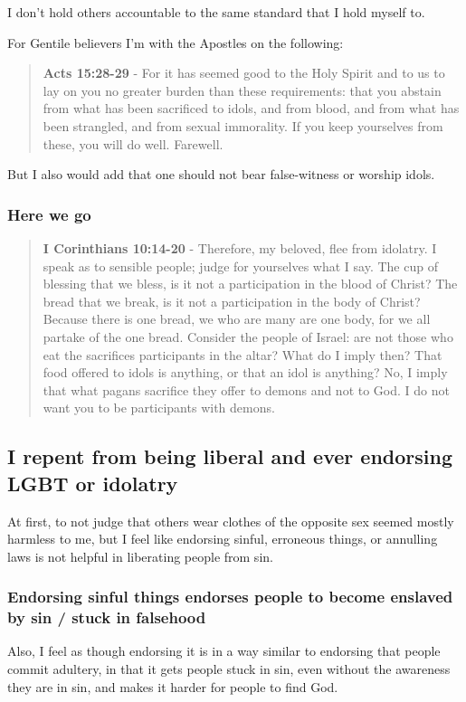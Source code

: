 \documentclass[11pt]{article}
\begin{document}
I don't hold others accountable to the same standard that I hold myself to.

For Gentile believers I'm with the Apostles on the following:

\begin{quote}
\textbf{Acts 15:28-29} - For it has seemed good to the Holy Spirit and to us to lay on you no greater burden than these requirements: that you abstain from what has been sacrificed to idols, and from blood, and from what has been strangled, and from sexual immorality. If you keep yourselves from these, you will do well. Farewell.
\end{quote}

But I also would add that one should not bear false-witness or worship idols.

\subsubsection{Here we go}
\label{sec:org60a0856}
\begin{quote}
\textbf{I Corinthians 10:14-20} - Therefore, my beloved, flee from idolatry.  I speak as to sensible people; judge for yourselves what I say.  The cup of blessing that we bless, is it not a participation in the blood of Christ? The bread that we break, is it not a participation in the body of Christ?  Because there is one bread, we who are many are one body, for we all partake of the one bread.  Consider the people of Israel: are not those who eat the sacrifices participants in the altar?  What do I imply then? That food offered to idols is anything, or that an idol is anything?  No, I imply that what pagans sacrifice they offer to demons and not to God. I do not want you to be participants with demons.
\end{quote}

\subsection{I repent from being liberal and ever endorsing LGBT or idolatry}
\label{sec:org62babb3}
At first, to not judge that others wear
clothes of the opposite sex seemed mostly
harmless to me, but I feel like endorsing
sinful, erroneous things, or annulling laws
is not helpful in liberating people from sin.

\subsubsection{Endorsing sinful things endorses people to become enslaved by sin / stuck in falsehood}
\label{sec:org571bf66}
Also, I feel as though endorsing it is in a
way similar to endorsing that people commit
adultery, in that it gets people stuck in sin,
even without the awareness they are in sin,
and makes it harder for people to find God.
\end{document}
